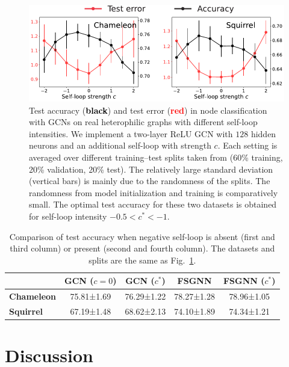 \documentclass[9pt,twocolumn]{pnas-new}
\begin{document}
\begin{figure}[h!]
    \includegraphics[width=\linewidth]{figs_real_selfloop.pdf}
    \caption{Test accuracy (\textcolor{black}{\textbf{black}}) and test error (\textcolor{red}{\textbf{red}}) in node classification with GCNs on real heterophilic graphs with different self-loop intensities. We implement a two-layer ReLU GCN with $128$ hidden neurons and an additional self-loop with strength $c$. Each setting is averaged over different training--test splits taken from \cite{pei2020geom} (60\% training, 20\% validation, 20\% test). The relatively large standard deviation (vertical bars) is  mainly due to the randomness of the splits. The randomness from model initialization and training is comparatively small. The optimal test accuracy for these two datasets is obtained for self-loop intensity $-0.5<c^*<-1$.} 
    \label{fig_selfloop_real}
\end{figure}


\begin{table}[h!]
\def\arraystretch{1.2}
\centering
\begin{tabular}{@{}lcccc@{}}
\toprule
          & \textbf{GCN} ($c=0$)  & \textbf{GCN} ($c^*$) & \textbf{FSGNN} & \textbf{FSGNN} ($c^*$) \\ \hline
\textbf{Chameleon} & 75.81±1.69 & 76.29±1.22 & 78.27±1.28& 78.96±1.05         \\
\textbf{Squirrel} & 67.19±1.48 & 68.62±2.13 & 74.10±1.89& 74.34±1.21   \\
\bottomrule
\end{tabular}
\caption{Comparison of test accuracy when negative self-loop is absent (first and third column) or present (second and fourth column). The datasets and splits are the same as Fig.~\ref{fig_selfloop_real}.}
\label{tab:fsgnn}
\end{table}





\section{Discussion}\label{sec: discussion}
\end{document}
